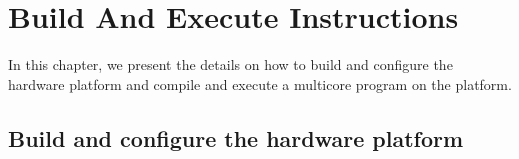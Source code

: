 \documentclass[a4paper,fontsize=10pt,twoside,DIV15,BCOR12mm,headinclude=true,footinclude=false,pagesize,bibtotoc]{scrbook}
\newcommand{\nopublish}[1]{}
\begin{document}
\nopublish{

\section{Circulating tokens - WCET}

This exercise will show how to calculate the maximum worst case throughput of tokens.
The exercise comprise the following tasks:
\begin{itemize}
\item Compile with platin
\item 
\label{list:ex2:num1}\end{itemize}

\section{Next exercise}

Ideas for other exercises:
\begin{itemize}
\item WCET analysis of the circulating tokens
  \begin{itemize}
  \item Worst case throughput of tokens
  \item Worst case latency of a token through two processors
  \end{itemize}
\item Health monitoring 
\item I/O server
\end{itemize}

}
\appendix

\chapter{Build And Execute Instructions}
\label{apx:build}

In this chapter, we present the details on how to 
build and configure the hardware platform and compile and execute 
a multicore program on the platform.

\section{Build and configure the hardware platform}
\label{apx:buildhw}
\end{document}
